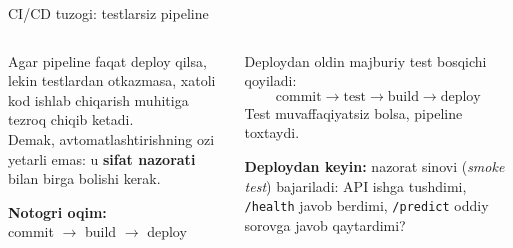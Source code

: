 \documentclass[aspectratio=169,11pt]{beamer}
\newcommand{\uzq}{\textquotesingle{}}   %
\begin{document}
\begin{frame}{CI/CD tuzog\uzq{}i: testlarsiz pipeline}
  \small

  \begin{columns}[T,totalwidth=\textwidth]
    \begin{column}{0.51\textwidth}
      \begin{tcolorbox}[warnbox,title={Muammo: faqat deploy avtomatik},top=2pt,bottom=2pt]
        \footnotesize
        Agar pipeline faqat deploy qilsa, lekin testlardan o\uzq{}tkazmasa,
        xatoli kod ishlab chiqarish muhitiga tezroq chiqib ketadi.\\[3pt]

        Demak, avtomatlashtirishning o\uzq{}zi yetarli emas:
        u \textbf{sifat nazorati} bilan birga bo\uzq{}lishi kerak.
      \end{tcolorbox}

      \vspace{4pt}

      \begin{tcolorbox}[defbox,top=2pt,bottom=2pt,left=4pt,right=4pt]
        \footnotesize
        \textbf{Noto\uzq{}g\uzq{}ri oqim:}\\[2pt]
        \centering
        commit $\rightarrow$ build $\rightarrow$ deploy
      \end{tcolorbox}
    \end{column}

    \begin{column}{0.46\textwidth}
      \begin{tcolorbox}[okbox,title={Yechim},top=2pt,bottom=2pt]
        \footnotesize
        Deploydan oldin majburiy test bosqichi qo\uzq{}yiladi:
        \[
          \text{commit}
          \rightarrow
          \text{test}
          \rightarrow
          \text{build}
          \rightarrow
          \text{deploy}
        \]
        Test muvaffaqiyatsiz bo\uzq{}lsa, pipeline to\uzq{}xtaydi.
      \end{tcolorbox}

      \vspace{4pt}

      \begin{tcolorbox}[okbox,top=2pt,bottom=2pt,left=4pt,right=4pt]
        \footnotesize
        \textbf{Deploydan keyin:}
        nazorat sinovi (\textit{smoke test}) bajariladi:
        API ishga tushdimi, \texttt{/health} javob berdimi,
        \texttt{/predict} oddiy so\uzq{}rovga javob qaytardimi?
      \end{tcolorbox}
    \end{column}
  \end{columns}
\end{frame}
\end{document}
